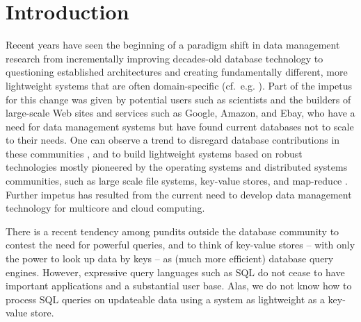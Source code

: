 \section{Introduction}


Recent years have seen the beginning of a paradigm shift in data management
research from incrementally
improving decades-old database technology
%
%
to questioning established architectures 
%
and creating fundamentally different, more lightweight systems
that are often domain-specific
(cf.\ e.g. \cite{DBLP:conf/vldb/StonebrakerMAHHH07,DBLP:journals/pvldb/KallmanKNPRZJMSZHA08}).
Part of the impetus for this change was given by 
potential users such as scientists and the builders of
large-scale Web sites and services such as Google, Amazon, and Ebay,
who have a need for data management systems but have found current databases
not to scale to their needs.
One can observe a trend to disregard database contributions
in these communities \cite{dbcolumn, DBLP:conf/sigmod/PavloPRADMS09}, and to build lightweight systems based on
robust technologies mostly pioneered by the operating systems and distributed
systems communities, such as large scale file systems, key-value stores, and
map-reduce
\cite{DBLP:journals/cacm/DeanG08, DBLP:journals/tocs/ChangDGHWBCFG08}.
Further impetus has resulted from the current need to develop data management
technology for multicore and cloud computing.
%

There is a recent tendency among pundits outside the database community to
contest the need for powerful queries, and to
think of key-value stores -- with only the power to look up data by
keys -- as (much more efficient) database query engines.
%
%
However, expressive query languages such as SQL do not cease to have
important applications and a substantial user base.
Alas, we do not know how to process SQL queries on updateable data
using a system as lightweight as a key-value store.

